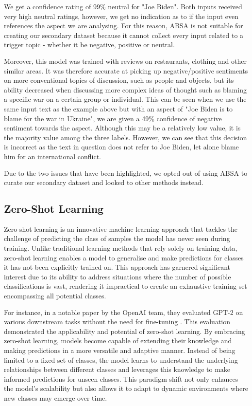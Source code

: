 We get a confidence rating of 99\% neutral for "Joe Biden". Both inputs received very high neutral ratings, however, we get no indication as to if the input even references the aspect we are analysing. For this reason, ABSA is not suitable for creating our secondary dataset because it cannot collect every input related to a trigger topic - whether it be negative, positive or neutral.

Moreover, this model was trained with reviews on restaurants, clothing and other similar areas. It was therefore accurate at picking up negative/positive sentiments on more conventional topics of discussion, such as people and objects, but its ability decreased when discussing more complex ideas of thought such as blaming a specific war on a certain group or individual. This can be seen when we use the same input text as the example above but with an aspect of "Joe Biden is to blame for the war in Ukraine", we are given a 49\% confidence of negative sentiment towards the aspect. Although this may be a relatively low value, it is the majority value among the three labels. However, we can see that this decision is incorrect as the text in question does not refer to Joe Biden, let alone blame him for an international conflict.

Due to the two issues that have been highlighted, we opted out of using ABSA to curate our secondary dataset and looked to other methods instead.

\subsection{Zero-Shot Learning}
\label{zero_shot}

Zero-shot learning is an innovative machine learning approach that tackles the challenge of predicting the class of samples the model has never seen during training. Unlike traditional learning methods that rely solely on training data, zero-shot learning enables a model to generalise and make predictions for classes it has not been explicitly trained on. This approach has garnered significant interest due to its ability to address situations where the number of possible classifications is vast, rendering it impractical to create an exhaustive training set encompassing all potential classes.

For instance, in a notable paper by the OpenAI team, they evaluated GPT-2 on various downstream tasks without the need for fine-tuning \cite{Radford2019LanguageMA}. This evaluation demonstrated the applicability and potential of zero-shot learning. By embracing zero-shot learning, models become capable of extending their knowledge and making predictions in a more versatile and adaptive manner. Instead of being limited to a fixed set of classes, the model learns to understand the underlying relationships between different classes and leverages this knowledge to make informed predictions for unseen classes. This paradigm shift not only enhances the model's scalability but also allows it to adapt to dynamic environments where new classes may emerge over time.

